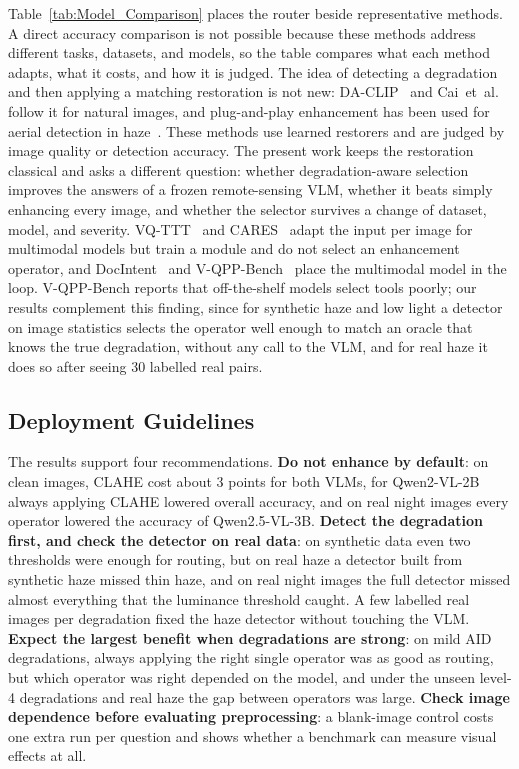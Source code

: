 \documentclass[lettersize,journal]{IEEEtran}
\begin{document}
Table~\ref{tab:Model_Comparison} places the router beside representative methods. A direct accuracy comparison is not possible because these methods address different tasks, datasets, and models, so the table compares what each method adapts, what it costs, and how it is judged. The idea of detecting a degradation and then applying a matching restoration is not new: DA-CLIP~\cite{luo2024daclip} and Cai~et~al.~\cite{cai2025degradationaware} follow it for natural images, and plug-and-play enhancement has been used for aerial detection in haze~\cite{wu2024plugplay}. These methods use learned restorers and are judged by image quality or detection accuracy. The present work keeps the restoration classical and asks a different question: whether degradation-aware selection improves the answers of a frozen remote-sensing VLM, whether it beats simply enhancing every image, and whether the selector survives a change of dataset, model, and severity. VQ-TTT~\cite{xing2025vqparadox} and CARES~\cite{kimhi2025cares} adapt the input per image for multimodal models but train a module and do not select an enhancement operator, and DocIntent~\cite{huang2026docintent} and V-QPP-Bench~\cite{zeng2026fixbeforesearch} place the multimodal model in the loop. V-QPP-Bench reports that off-the-shelf models select tools poorly; our results complement this finding, since for synthetic haze and low light a detector on image statistics selects the operator well enough to match an oracle that knows the true degradation, without any call to the VLM, and for real haze it does so after seeing 30 labelled real pairs.

\subsection{Deployment Guidelines}

The results support four recommendations. \textbf{Do not enhance by default}: on clean images, CLAHE cost about 3 points for both VLMs, for Qwen2-VL-2B always applying CLAHE lowered overall accuracy, and on real night images every operator lowered the accuracy of Qwen2.5-VL-3B. \textbf{Detect the degradation first, and check the detector on real data}: on synthetic data even two thresholds were enough for routing, but on real haze a detector built from synthetic haze missed thin haze, and on real night images the full detector missed almost everything that the luminance threshold caught. A few labelled real images per degradation fixed the haze detector without touching the VLM. \textbf{Expect the largest benefit when degradations are strong}: on mild AID degradations, always applying the right single operator was as good as routing, but which operator was right depended on the model, and under the unseen level-4 degradations and real haze the gap between operators was large. \textbf{Check image dependence before evaluating preprocessing}: a blank-image control costs one extra run per question and shows whether a benchmark can measure visual effects at all.
\end{document}
